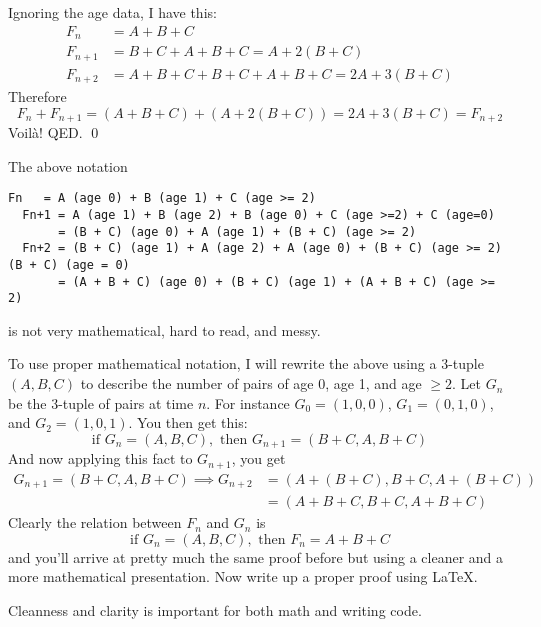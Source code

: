 Ignoring the age data, I have this:
\begin{align*}
  F_n &= A + B + C \\
  F_{n+1} &= B + C + A + B + C = A + 2(B + C)\\
  F_{n+2} &= A + B + C + B + C + A + B + C = 2A + 3(B + C)
\end{align*}
Therefore
\[
F_n + F_{n + 1} = \left(A + B + C\right) + \left(A + 2(B + C)\right) = 2A + 3(B + C) = F_{n + 2}
\]
Voil\`a! QED.
\qed

The above notation
\begin{Verbatim}[fontsize=\footnotesize]
  Fn   = A (age 0) + B (age 1) + C (age >= 2)
  Fn+1 = A (age 1) + B (age 2) + B (age 0) + C (age >=2) + C (age=0)
       = (B + C) (age 0) + A (age 1) + (B + C) (age >= 2)
  Fn+2 = (B + C) (age 1) + A (age 2) + A (age 0) + (B + C) (age >= 2)  (B + C) (age = 0)
       = (A + B + C) (age 0) + (B + C) (age 1) + (A + B + C) (age >= 2)
  \end{Verbatim}
is not very mathematical, hard to read, and messy.

To use proper mathematical notation, I will rewrite the above
using a 3-tuple $(A, B, C)$
to describe the number of pairs of age 0, age 1, and age $\geq 2$.
Let $G_n$ be the 3-tuple of pairs at time $n$.
For instance $G_0 = (1, 0, 0)$, $G_1 = (0, 1, 0)$, and $G_2 = (1, 0, 1)$.
You then get this:
\[
\text{if } G_n = (A, B, C), \text{ then }
G_{n+1} = (B + C, A, B + C)
\]
And now applying this fact to $G_{n + 1}$, you get
\begin{align*}
G_{n+1} = (B + C, A, B + C) \implies
G_{n + 2} &= (A + (B + C), B + C, A + (B + C)) \\
         &= (A + B + C, B + C, A + B + C)
\end{align*}
Clearly the relation between $F_n$ and $G_n$ is
\[
\text{if } G_n = (A,B,C), \text{ then } F_n = A + B + C
\]
and you'll arrive at pretty much the same proof before
but using a cleaner and a more mathematical presentation.
Now write up a proper proof using \LaTeX.

Cleanness and clarity is important for both math and writing code.







